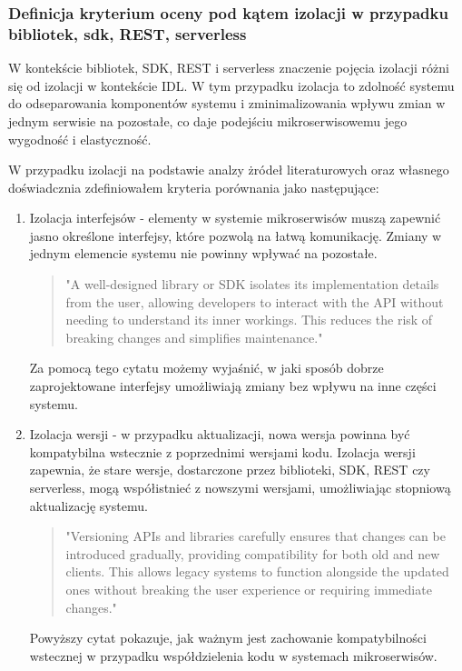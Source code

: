 \documentclass[runningheads,12pt]{llncs}
\begin{document}
\subsubsection{Definicja kryterium oceny pod kątem izolacji w przypadku bibliotek, sdk, REST, serverless}

W kontekście bibliotek, SDK, REST i serverless znaczenie pojęcia izolacji różni się od izolacji w kontekście IDL. W tym przypadku izolacja to zdolność systemu do odseparowania komponentów systemu i zminimalizowania wpływu zmian w jednym serwisie na pozostałe, co daje podejściu mikroserwisowemu jego wygodność i elastyczność.

W przypadku izolacji na podstawie analzy żródeł literaturowych oraz własnego doświadcznia zdefiniowałem kryteria porównania jako następujące:

\begin{enumerate}
    \item Izolacja interfejsów - elementy w systemie mikroserwisów muszą zapewnić jasno określone interfejsy, które pozwolą na łatwą komunikację. Zmiany w jednym elemencie systemu nie powinny wpływać na pozostałe.
    \begin{quote}
        "A well-designed library or SDK isolates its implementation details from the user, allowing developers to interact with the API without needing to understand its inner workings. This reduces the risk of breaking changes and simplifies maintenance." ~\cite[p. 75]{bloch2018effective}
    \end{quote}
    Za pomocą tego cytatu możemy wyjaśnić, w jaki sposób dobrze zaprojektowane interfejsy umożliwiają zmiany bez wpływu na inne części systemu.
    
    \item Izolacja wersji - w przypadku aktualizacji, nowa wersja powinna być kompatybilna wstecznie z poprzednimi wersjami kodu. Izolacja wersji zapewnia, że stare wersje, dostarczone przez biblioteki, SDK, REST czy serverless, mogą współistnieć z nowszymi wersjami, umożliwiając stopniową aktualizację systemu.
    \begin{quote}
        "Versioning APIs and libraries carefully ensures that changes can be introduced gradually, providing compatibility for both old and new clients. This allows legacy systems to function alongside the updated ones without breaking the user experience or requiring immediate changes." ~\cite[p. 172]{fowler2012patterns}
    \end{quote}
    Powyższy cytat pokazuje, jak ważnym jest zachowanie kompatybilności wstecznej w przypadku współdzielenia kodu w systemach mikroserwisów.
    

\end{enumerate}
\end{document}
